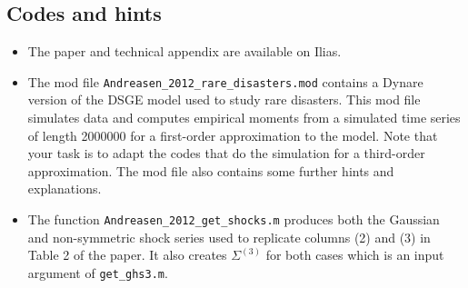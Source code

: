 \documentclass{article}
\begin{document}
\newpage

\subsection*{Codes and hints}

\begin{itemize}
\item
The paper and technical appendix are available on Ilias.

\item
The mod file \texttt{Andreasen\_2012\_rare\_disasters.mod} contains a Dynare version of the DSGE model used to study rare disasters.
This mod file simulates data and computes empirical moments from a simulated time series of length 2000000 for a first-order approximation to the model.
Note that your task is to adapt the codes that do the simulation for a third-order approximation.
The mod file also contains some further hints and explanations.

\item
The function \texttt{Andreasen\_2012\_get\_shocks.m} produces both the Gaussian and non-symmetric shock series used to replicate columns (2) and (3) in Table 2 of the paper.
It also creates \(\Sigma^{(3)}\) for both cases which is an input argument of \texttt{get\_ghs3.m}.


\end{itemize}
\end{document}
